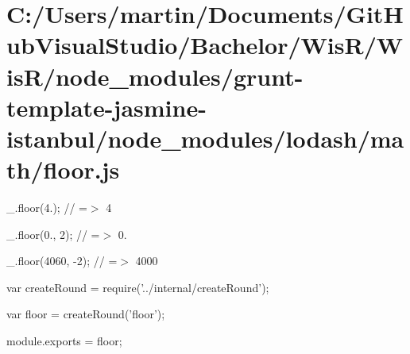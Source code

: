 \hypertarget{_c_1_2_users_2martin_2_documents_2_git_hub_visual_studio_2_bachelor_2_wis_r_2_wis_r_2node_module3ecd4569d5e8ffd64b9f0c95714f1e60}{}\section{C\+:/\+Users/martin/\+Documents/\+Git\+Hub\+Visual\+Studio/\+Bachelor/\+Wis\+R/\+Wis\+R/node\+\_\+modules/grunt-\/template-\/jasmine-\/istanbul/node\+\_\+modules/lodash/math/floor.\+js}
\+\_\+.\+floor(4.); // =$>$ 4

\+\_\+.\+floor(0., 2); // =$>$ 0.

\+\_\+.\+floor(4060, -\/2); // =$>$ 4000


\begin{DoxyCodeInclude}
var createRound = require(\textcolor{stringliteral}{'../internal/createRound'});

var floor = createRound(\textcolor{stringliteral}{'floor'});

module.exports = floor;
\end{DoxyCodeInclude}
 